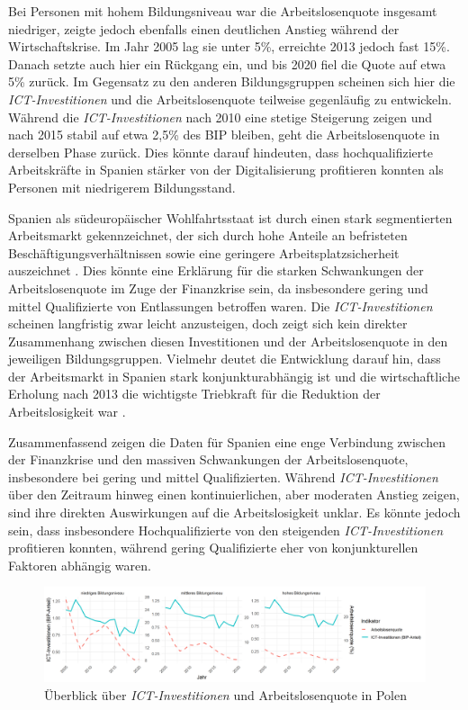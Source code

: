 Bei Personen mit hohem Bildungsniveau war die Arbeitslosenquote insgesamt niedriger, 
zeigte jedoch ebenfalls einen deutlichen Anstieg während der Wirtschaftskrise. Im Jahr 
2005 lag sie unter 5\%, erreichte 2013 jedoch fast 15\%. Danach setzte auch hier ein 
Rückgang ein, und bis 2020 fiel die Quote auf etwa 5\% zurück. Im Gegensatz zu den 
anderen Bildungsgruppen scheinen sich hier die \textit{\ac{ICT}-Investitionen} und 
die Arbeitslosenquote teilweise gegenläufig zu entwickeln. Während die 
\textit{\ac{ICT}-Investitionen} nach 2010 eine stetige Steigerung zeigen und nach 
2015 stabil auf etwa 2,5\% des BIP bleiben, geht die Arbeitslosenquote in derselben 
Phase zurück. Dies könnte darauf hindeuten, dass hochqualifizierte Arbeitskräfte in 
Spanien stärker von der Digitalisierung profitieren konnten als Personen mit 
niedrigerem Bildungsstand.

Spanien als südeuropäischer Wohlfahrtsstaat ist durch einen stark segmentierten 
Arbeitsmarkt gekennzeichnet, der sich durch hohe Anteile an befristeten 
Beschäftigungsverhältnissen sowie eine geringere Arbeitsplatzsicherheit auszeichnet 
\parencite[vgl.][F155–F160]{bentolila2012two}. Dies könnte eine Erklärung für die starken 
Schwankungen der Arbeitslosenquote im Zuge der Finanzkrise sein, da insbesondere 
gering und mittel Qualifizierte von Entlassungen betroffen waren. Die 
\textit{\ac{ICT}-Investitionen} scheinen langfristig zwar leicht anzusteigen, doch zeigt 
sich kein direkter Zusammenhang zwischen diesen Investitionen und der Arbeitslosenquote 
in den jeweiligen Bildungsgruppen. Vielmehr deutet die Entwicklung darauf hin, dass der 
Arbeitsmarkt in Spanien stark konjunkturabhängig ist und die wirtschaftliche Erholung 
nach 2013 die wichtigste Triebkraft für die Reduktion der Arbeitslosigkeit war 
\parencite[vgl.][F155–F160]{bentolila2012two}.

Zusammenfassend zeigen die Daten für Spanien eine enge Verbindung zwischen der 
Finanzkrise und den massiven Schwankungen der Arbeitslosenquote, insbesondere bei 
gering und mittel Qualifizierten. Während \textit{\ac{ICT}-Investitionen} über den 
Zeitraum hinweg einen kontinuierlichen, aber moderaten Anstieg zeigen, sind ihre 
direkten Auswirkungen auf die Arbeitslosigkeit unklar. Es könnte jedoch sein, dass 
insbesondere Hochqualifizierte von den steigenden \textit{\ac{ICT}-Investitionen} 
profitieren konnten, während gering Qualifizierte eher von konjunkturellen 
Faktoren abhängig waren.

\begin{figure}[htbp]
    \centering
    \includegraphics[width=\textwidth]{assets/plot_poland.png}
    \caption{Überblick über \textit{\ac{ICT}-Investitionen} und Arbeitslosenquote 
    in Polen}
    \label{fig:poland}
\end{figure}

